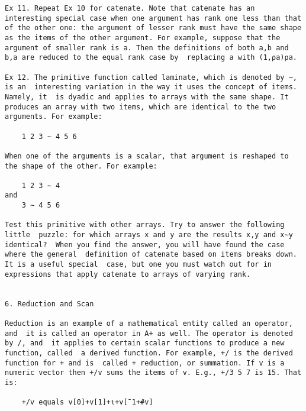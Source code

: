 \documentclass{article}
\begin{document}
\begin{verbatim}
Ex 11. Repeat Ex 10 for catenate. Note that catenate has an           
interesting special case when one argument has rank one less than that
of the other one: the argument of lesser rank must have the same shape
as the items of the other argument. For example, suppose that the     
argument of smaller rank is a. Then the definitions of both a,b and   
b,a are reduced to the equal rank case by  replacing a with (1,⍴a)⍴a. 

Ex 12. The primitive function called laminate, which is denoted by ∼, 
is an  interesting variation in the way it uses the concept of items. 
Namely, it  is dyadic and applies to arrays with the same shape. It   
produces an array with two items, which are identical to the two      
arguments. For example:                                               

	1 2 3 ∼ 4 5 6                                                        

When one of the arguments is a scalar, that argument is reshaped to   
the shape of the other. For example:                                  

	1 2 3 ∼ 4                                                            
and                                                                   
	3 ∼ 4 5 6                                                            

Test this primitive with other arrays. Try to answer the following    
little  puzzle: for which arrays x and y are the results x,y and x∼y  
identical?  When you find the answer, you will have found the case    
where the general  definition of catenate based on items breaks down. 
It is a useful special  case, but one you must watch out for in       
expressions that apply catenate to arrays of varying rank.            


6. Reduction and Scan                                                 

Reduction is an example of a mathematical entity called an operator,  
and  it is called an operator in A+ as well. The operator is denoted  
by /, and  it applies to certain scalar functions to produce a new    
function, called  a derived function. For example, +/ is the derived  
function for + and is  called + reduction, or summation. If v is a    
numeric vector then +/v sums the items of v. E.g., +/3 5 7 is 15. That
is:                                                                   

	+/v equals v[0]+v[1]+⍳+v[¯1+#v]                                      


\end{verbatim}
\end{document}
